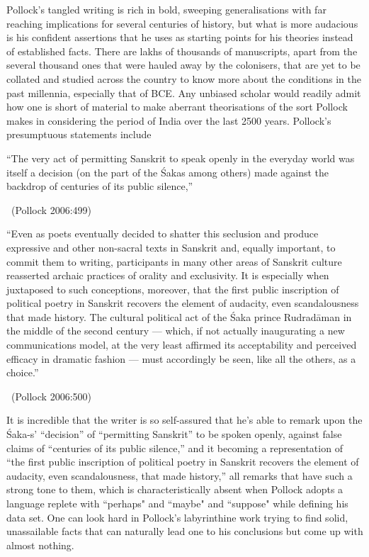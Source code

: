 Pollock’s tangled writing is rich in bold, sweeping generalisations with far reaching implications for several centuries of history, but what is more audacious is his confident assertions that he uses as starting points for his theories instead of established facts. There are lakhs of thousands of manuscripts, apart from the several thousand ones that were hauled away by the colonisers, that are yet to be collated and studied across the country to know more about the conditions in the past millennia, especially that of BCE. Any unbiased scholar would readily admit how one is short of material to make aberrant theorisations of the sort Pollock makes in considering the period of India over the last 2500 years. Pollock’s presumptuous statements include

\begin{myquote}
“The very act of permitting Sanskrit to speak openly in the everyday world was itself a decision (on the part of the Śakas among others) made against the backdrop of centuries of its public silence,” 

~\hfill (Pollock 2006:499)
\end{myquote}

\begin{myquote}
“Even as poets eventually decided to shatter this seclusion and produce expressive and other non-sacral texts in Sanskrit and, equally important, to commit them to writing, participants in many other areas of Sanskrit culture reasserted archaic practices of orality and exclusivity. It is especially when juxtaposed to such conceptions, moreover, that the first public inscription of political poetry in Sanskrit recovers the element of audacity, even scandalousness that made history. The cultural political act of the Śaka prince Rudradāman in the middle of the second century — which, if not actually inaugurating a new communications model, at the very least affirmed its acceptability and perceived efficacy in dramatic fashion — must accordingly be seen, like all the others, as a choice.” 

~\hfill (Pollock 2006:500)
\end{myquote}

It is incredible that the writer is so self-assured that he’s able to remark upon the Śaka-s' “decision” of “permitting Sanskrit” to be spoken openly, against false claims of “centuries of its public silence,” and it becoming a representation of “the first public inscription of political poetry in Sanskrit recovers the element of audacity, even scandalousness, that made history,” all remarks that have such a strong tone to them, which is characteristically absent when Pollock adopts a language replete with “perhaps" and “maybe" and “suppose" while defining his data set. One can look hard in Pollock’s labyrinthine work trying to find solid, unassailable facts that can naturally lead one to his conclusions but come up with almost nothing.


